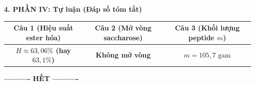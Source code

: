 \documentclass[11pt,a4paper]{article}
\begin{document}
\vspace{3pt}
\noindent
\textbf{\color{mainGreen}4. PHẦN IV: Tự luận (Đáp số tóm tắt)}
\begin{center}
\renewcommand{\arraystretch}{1.25}
\begin{tabular}{|c|c|c|}
\hline
\textbf{Câu 1 (Hiệu suất ester hóa)} & \textbf{Câu 2 (Mở vòng saccharose)} & \textbf{Câu 3 (Khối lượng peptide $m$)} \\
\hline
\textbf{\color{hfRed}$H \approx 63,06\%$ (hay $63,1\%$)} & \textbf{\color{hfRed}Không mở vòng} & \textbf{\color{hfRed}$m = 105,7\text{ gam}$} \\
\hline
\end{tabular}
\end{center}

\begin{center}
\textbf{---------- HẾT ----------}
\end{center}
\end{document}
